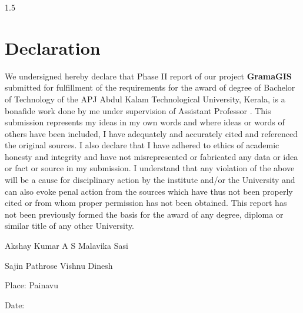 \thispagestyle{empty}

\begin{spacing}{1.5}
\chapter*{Declaration}
%
We undersigned hereby declare that Phase II report of our project
\textbf{GramaGIS} submitted for fulfillment of the requirements for the award of degree of Bachelor of Technology of
the APJ Abdul Kalam Technological University, Kerala, is a bonafide work done by me
under supervision of Assistant Professor \vguide. This submission represents my ideas in
my own words and where ideas or words of others have been included, I have adequately
and accurately cited and referenced the original sources. I also declare that I have
adhered to ethics of academic honesty and integrity and have not misrepresented or
fabricated any data or idea or fact or source in my submission. I understand that any
violation of the above will be a cause for disciplinary action by the institute and/or the
University and can also evoke penal action from the sources which have thus not been
properly cited or from whom proper permission has not been obtained. This report has
not been previously formed the basis for the award of any degree, diploma or similar title
of any other University. \\

\vspace{1cm}


\noindent Akshay Kumar A S \hfill Malavika Sasi\\

\vspace{.5cm}


 
\noindent Sajin Pathrose \hfill Vishnu Dinesh
\vspace{2cm}

\noindent Place: Painavu

\noindent Date: \ddate

\end{spacing}  
